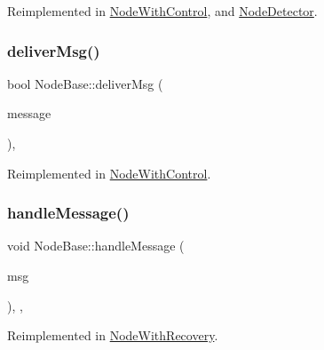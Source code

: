 Reimplemented in \hyperlink{class_node_with_control_a7772568c2836f5f204952ebe659e0049}{Node\+With\+Control}, and \hyperlink{class_node_detector_a7100349647350ad5e3aeb1ed4669c723}{Node\+Detector}.

\mbox{\label{class_node_base_a49052382add1123da26db6bfb687d254}} 
\subsubsection{\texorpdfstring{deliver\+Msg()}{deliverMsg()}}
{\footnotesize\ttfamily bool Node\+Base\+::deliver\+Msg (\begin{DoxyParamCaption}\item[{const \hyperlink{structures_8h_a7e7bdc1d2fff8a9436f2f352b2711ed6}{message\+Info} \&}]{message }\end{DoxyParamCaption})\hspace{0.3cm}{\ttfamily [protected]}, {\ttfamily [virtual]}}



Reimplemented in \hyperlink{class_node_with_control_aada7451be61be592b27188b6249afef2}{Node\+With\+Control}.

\mbox{\label{class_node_base_add2450264be5dd616f9f9ac94e83b988}} 
\subsubsection{\texorpdfstring{handle\+Message()}{handleMessage()}}
{\footnotesize\ttfamily void Node\+Base\+::handle\+Message (\begin{DoxyParamCaption}\item[{c\+Message $\ast$}]{msg }\end{DoxyParamCaption})\hspace{0.3cm}{\ttfamily [override]}, {\ttfamily [protected]}, {\ttfamily [virtual]}}



Reimplemented in \hyperlink{class_node_with_recovery_a901c89606b84898e13fe8a66228acd9f}{Node\+With\+Recovery}.

\mbox{\label{class_node_base_af7910c39553111295b66c88742d1198a}} 
